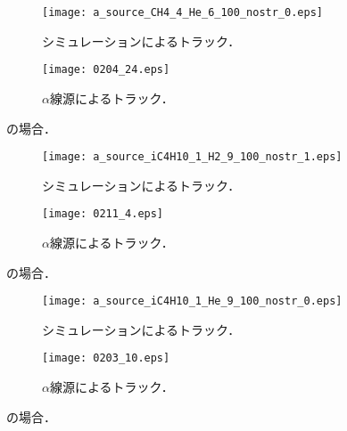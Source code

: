 \documentclass[../master]{subfiles}
\begin{document}
\begin{figure}
  \centering
  \begin{subfigure}{0.48\columnwidth}
    \centering
    \texttt{[image: a\_source\_CH4\_4\_He\_6\_100\_nostr\_0.eps]}
    \caption{シミュレーションによるトラック．}
  \end{subfigure}
  \begin{subfigure}{0.48\columnwidth}
    \centering
    \texttt{[image: 0204\_24.eps]}
    \caption{$\alpha$線源によるトラック．}
  \end{subfigure}
  \caption{\MethaneHerium の場合．}
  \label{fig::track_ch4_he_loss}
\end{figure}
\begin{figure}
  \centering
  \begin{subfigure}{0.48\columnwidth}
    \centering
    \texttt{[image: a\_source\_iC4H10\_1\_H2\_9\_100\_nostr\_1.eps]}
    \caption{シミュレーションによるトラック．}
  \end{subfigure}
  \begin{subfigure}{0.48\columnwidth}
    \centering
    \texttt{[image: 0211\_4.eps]}
    \caption{$\alpha$線源によるトラック．}
  \end{subfigure}
  \caption{\isoButaneHydro の場合．}
  \label{fig::track_ic4h10_h2_loss}
\end{figure}
\begin{figure}
  \centering
  \begin{subfigure}{0.48\columnwidth}
    \centering
    \texttt{[image: a\_source\_iC4H10\_1\_He\_9\_100\_nostr\_0.eps]}
    \caption{シミュレーションによるトラック．}
  \end{subfigure}
  \begin{subfigure}{0.48\columnwidth}
    \centering
    \texttt{[image: 0203\_10.eps]}
    \caption{$\alpha$線源によるトラック．}
  \end{subfigure}
  \caption{\isoButaneHerium の場合．}
  \label{fig::track_ic4h10_he_loss}
\end{figure}
\end{document}
